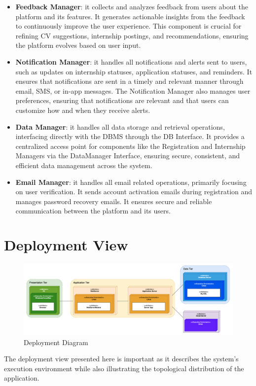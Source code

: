 \begin{itemize}
    \item \textbf{Feedback Manager}: it collects and analyzes feedback from users about the platform and its features. It generates actionable insights from the feedback to continuously improve the user experience. This component is crucial for refining CV suggestions, internship postings, and recommendations, ensuring the platform evolves based on user input.
    \item \textbf{Notification Manager}: it handles all notifications and alerts sent to users, such as updates on internship statuses, application statuses, and reminders. It ensures that notifications are sent in a timely and relevant manner through email, SMS, or in-app messages. The Notification Manager also manages user preferences, ensuring that notifications are relevant and that users can customize how and when they receive alerts.
    \item \textbf{Data Manager}: it handles all data storage and retrieval operations, interfacing directly with the DBMS through the DB Interface. It provides a centralized access point for components like the Registration and Internship Managers via the DataManager Interface, ensuring secure, consistent, and efficient data management across the system.
    \item \textbf{Email Manager}: it handles all email related operations, primarily focusing on user verification. It sends account activation emails during registration and manages password recovery emails. It ensures secure and reliable communication between the platform and its users.
\end{itemize}

\section{Deployment View}
\begin{figure}[H]
    \centering
    \includegraphics[width=1\linewidth]{DD/Images/deployment_diagram.png}
    \caption{Deployment Diagram}
    \label{fig:enter-label}
\end{figure}
The deployment view presented here is important as it describes the system's execution environment while also illustrating the topological distribution of the application.

